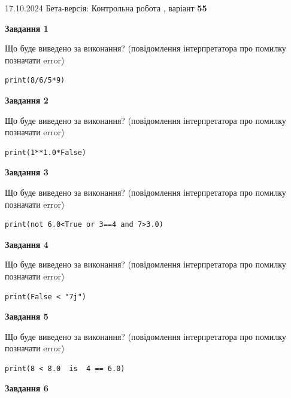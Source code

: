 \documentclass[12pt, ukrainian]{article}
\begin{document}
{\Large{17.10.2024 Бета-версія: Контрольна робота , варіант  \No \textbf { 55 }\par}}
{
\begin {large}
{\begin {center}\textbf{Завдання 1}\end {center}}

Що буде виведено за виконання? (повідомлення інтерпретатора про помилку позначати error)\par
\begin{verbatim}
print(8/6/5*9)
\end{verbatim}

{\begin {center}\textbf{Завдання 2}\end {center}}

Що буде виведено за виконання? (повідомлення інтерпретатора про помилку позначати error)\par
\begin{verbatim}
print(1**1.0*False)
\end{verbatim}

{\begin {center}\textbf{Завдання 3}\end {center}}

Що буде виведено за виконання? (повідомлення інтерпретатора про помилку позначати error)\par
\begin{verbatim}
print(not 6.0<True or 3==4 and 7>3.0)
\end{verbatim}

{\begin {center}\textbf{Завдання 4}\end {center}}

Що буде виведено за виконання? (повідомлення інтерпретатора про помилку позначати error)\par
\begin{verbatim}
print(False < "7j")
\end{verbatim}

{\begin {center}\textbf{Завдання 5}\end {center}}

Що буде виведено за виконання? (повідомлення інтерпретатора про помилку позначати error)\par
\begin{verbatim}
print(8 < 8.0  is  4 == 6.0)
\end{verbatim}

{\begin {center}\textbf{Завдання 6}\end {center}}


\end{large}}
\end{document}
